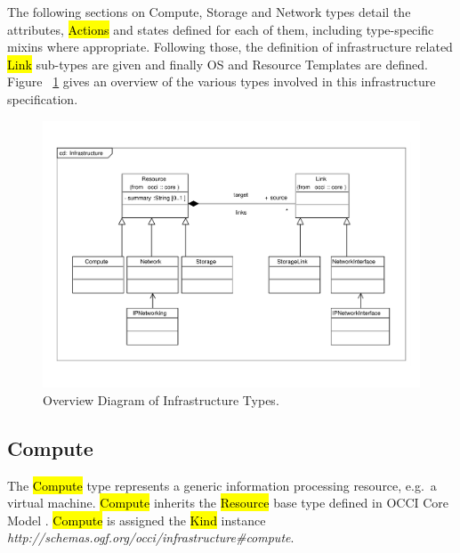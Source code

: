 \documentclass[10pt,a4paper]{article}
\begin{document}
The following sections on Compute, Storage and Network types detail the attributes, 
\hl{Actions} and states defined for each of them, including type-specific mixins where 
appropriate. Following those, the definition of infrastructure related \hl{Link} sub-types 
are given and finally OS and Resource Templates are defined. Figure ~\ref{fig:infra_uml} gives an overview
of the various types involved in this infrastructure specification.

\begin{figure}[!h]
	\centering
	\includegraphics[scale=0.3]{figs/infrastructure}
	\caption{Overview Diagram of Infrastructure Types.}
	\label{fig:infra_uml}
\end{figure}

\subsection{Compute}
The \hl{Compute} type represents a generic information processing resource, e.g.~a
virtual machine. \hl{Compute} inherits the \hl{Resource} base type defined in
OCCI Core Model \cite{occi:core}.
\hl{Compute} is assigned the \hl{Kind} instance
\textit{http://schemas.ogf.org/occi/infrastructure\#compute}.
\end{document}
